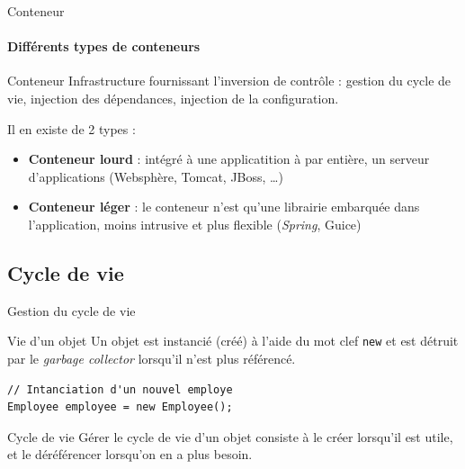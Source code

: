 \documentclass[compress]{beamer}%
\begin{document}
\begin{frame}{Conteneur}
	\framesubtitle{Différents types de conteneurs}

	\begin{block}{Conteneur}
		Infrastructure fournissant l'inversion de contrôle : gestion du cycle de vie, injection des dépendances, injection de la configuration.
	\end{block}

	\pause
	Il en existe de 2 types :
	\begin{itemize}
		\item \textbf{Conteneur lourd} : intégré à une applicatition à par entière, un serveur d'applications (Websphère, Tomcat, JBoss, \dots)
		\item \textbf{Conteneur léger} : le conteneur n'est qu'une librairie embarquée dans l'application, moins intrusive et plus flexible (\emph{Spring}, Guice)
	\end{itemize}
\end{frame}

\subsection{Cycle de vie}

\begin{frame}[fragile]{Gestion du cycle de vie}

	\begin{block}{Vie d'un objet}
	Un objet est instancié (créé) à l'aide du mot clef \texttt{new} et est détruit par le \emph{garbage collector} lorsqu'il n'est plus référencé.
	\end{block}

	\begin{lstlisting}
// Intanciation d'un nouvel employe
Employee employee = new Employee();
	\end{lstlisting}


	\pause
	\begin{block}{Cycle de vie}
	Gérer le cycle de vie d'un objet consiste à le créer lorsqu'il est utile, et le déréférencer lorsqu'on en a plus besoin.
	\end{block}

\end{frame}
\end{document}
